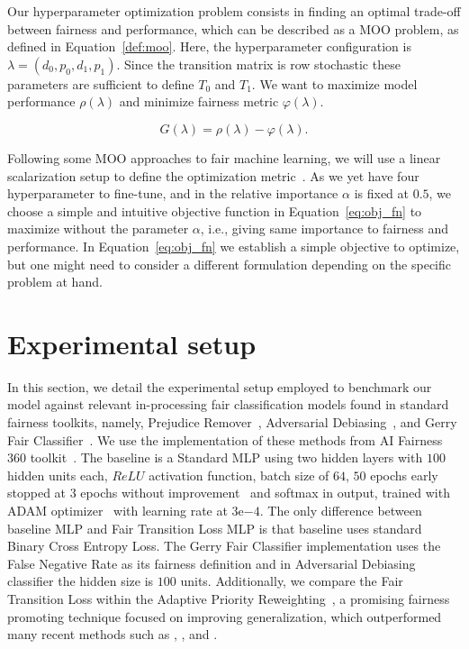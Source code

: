 Our hyperparameter optimization problem consists in finding an optimal trade-off between fairness and performance, which can be described as a MOO problem, as defined in Equation~\ref{def:moo}. Here, the hyperparameter configuration is $\lambda = (d_0, p_0, d_1, p_1)$. Since the transition matrix is row stochastic these parameters are sufficient to define $T_0$ and $T_1$. We want to maximize model performance $\rho(\lambda)$ and minimize fairness metric $\varphi(\lambda)$. 

\begin{equation} \label{eq:obj_fn}
    G(\lambda) = \rho(\lambda) - \varphi(\lambda).
\end{equation}

Following some MOO approaches to fair machine learning, we will use a linear scalarization setup to define the optimization metric~\citep{Schmucker2020,Petrovic2021}. As we yet have four hyperparameter to fine-tune, and in \cite{Cruz2021} the relative importance $\alpha$ is fixed at $0.5$, we choose a simple and intuitive objective function in Equation~\ref{eq:obj_fn} to maximize without the parameter $\alpha$, i.e., giving same importance to fairness and performance. In Equation~\ref{eq:obj_fn} we establish a simple objective to optimize, but one might need to consider a different formulation depending on the specific problem at hand.


\section{Experimental setup} \label{sec:experimental}

In this section, we detail the experimental setup employed to benchmark our model against relevant in-processing fair classification models found in standard fairness toolkits, namely, Prejudice Remover~\citep{Kamishima2012}, Adversarial Debiasing~\citep{Zhang2018}, and Gerry Fair Classifier~\citep{kearns18a}. We use the implementation of these methods from AI Fairness 360 toolkit~\citep{aif360-oct-2018}. The baseline is a Standard MLP using two hidden layers with $100$ hidden units each, $ReLU$ activation function, batch size of $64$, $50$ epochs early stopped at $3$ epochs without improvement~\citep{Li2020} and softmax in output, trained with ADAM optimizer~\citep{KingmaB14} with learning rate at $3\mathrm{e}{-4}$. The only difference between baseline MLP and Fair Transition Loss MLP is that baseline uses standard Binary Cross Entropy Loss. The Gerry Fair Classifier implementation uses the False Negative Rate as its fairness definition and in Adversarial Debiasing classifier the hidden size is $100$ units. Additionally, we compare the Fair Transition Loss within the Adaptive Priority Reweighting~\cite{HuXT23}, a promising fairness promoting technique focused on improving generalization, which outperformed many recent methods such as \cite{jiang2020identifying}, \cite{mroueh2021fair}, and \cite{roh2020fairbatch}.

